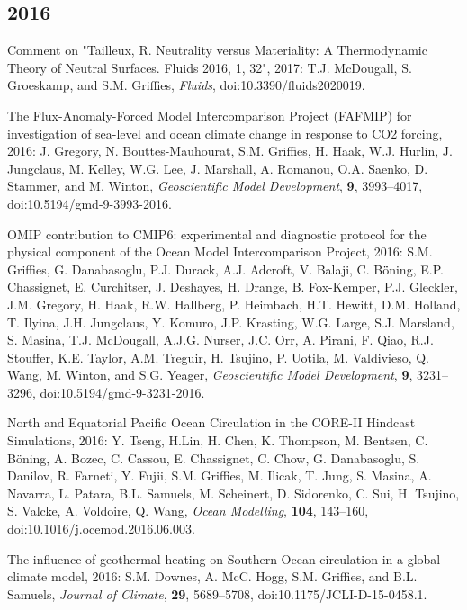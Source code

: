 \begin{etaremune}
\subsection*{\sc \color{Maroon} 2016}


\item Comment on "Tailleux, R. Neutrality versus Materiality: A Thermodynamic Theory of Neutral Surfaces. Fluids 2016, 1, 32", 2017: T.J. McDougall, S. Groeskamp, and S.M. Grif\/f\/ies, 
{\it Fluids}, doi:10.3390/fluids2020019. 

\item The Flux-Anomaly-Forced Model Intercomparison Project (FAFMIP) for investigation of sea-level and ocean climate change in response to CO2 forcing, 2016: J. Gregory, N. Bouttes-Mauhourat, S.M. Grif\/f\/ies, H. Haak, W.J. Hurlin, J.  Jungclaus, M. Kelley, W.G. Lee, J. Marshall, A. Romanou, O.A. Saenko, D. Stammer, and M.  Winton, {\it Geoscientific Model Development},
  {\bf 9}, 3993--4017, doi:10.5194/gmd-9-3993-2016.


\item OMIP contribution to CMIP6: experimental and diagnostic protocol for the physical component of the Ocean Model Intercomparison  Project, 2016: S.M. Grif\/f\/ies, G. Danabasoglu, P.J. Durack,  A.J. Adcroft, V. Balaji, C. B\"{o}̈ning, E.P. Chassignet, E. Curchitser, J. Deshayes, H. Drange, B. Fox-Kemper, P.J. Gleckler, J.M. Gregory, H. Haak, R.W. Hallberg, P. Heimbach, H.T. Hewitt, D.M. Holland, T. Ilyina, J.H. Jungclaus, Y. Komuro, J.P. Krasting, W.G. Large, S.J. Marsland, S. Masina, T.J. McDougall, A.J.G. Nurser, J.C. Orr, A. Pirani, F. Qiao, R.J. Stouffer, K.E. Taylor, A.M. Treguir, H. Tsujino, P. Uotila, M. Valdivieso, Q. Wang, M. Winton, and S.G. Yeager, {\it Geoscientific Model Development}, {\bf 9}, 3231--3296, doi:10.5194/gmd-9-3231-2016.

\item North and Equatorial Pacific Ocean Circulation in the CORE-II Hindcast Simulations, 2016: Y. Tseng, H.Lin, H. Chen, K.  Thompson,  M. Bentsen, C. B\"{o}ning, A. Bozec, C. Cassou, E.  Chassignet,  C. Chow, G. Danabasoglu, S. Danilov, R. Farneti, Y. Fujii, S.M. Grif\/f\/ies, M. Ilicak, T. Jung, S. Masina, A. Navarra,
  L. Patara, B.L.  Samuels, M. Scheinert, D. Sidorenko, C. Sui,  H. Tsujino, S. Valcke, A. Voldoire, Q. Wang, {\it Ocean Modelling},  {\bf 104}, 143--160, doi:10.1016/j.ocemod.2016.06.003.

\item The influence of geothermal heating on Southern Ocean  circulation in a global climate model, 2016: S.M. Downes,  A. McC. Hogg, S.M. Grif\/f\/ies, and B.L. Samuels, {\it Journal of Climate}, {\bf 29}, 5689--5708,
  doi:10.1175/JCLI-D-15-0458.1.


\end{etaremune}
